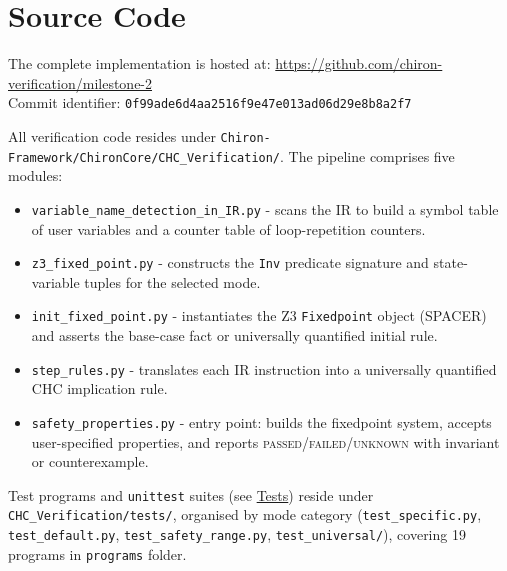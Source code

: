 \section*{Source Code}

The complete implementation is hosted at: \url{https://github.com/chiron-verification/milestone-2}
\\Commit identifier: \texttt{0f99ade6d4aa2516f9e47e013ad06d29e8b8a2f7}

\bigskip
\noindent
All verification code resides under \texttt{Chiron-Framework/ChironCore/CHC\_Verification/}.
The pipeline comprises five modules:

\begin{itemize}
  \item \texttt{variable\_name\_detection\_in\_IR.py} - scans the IR to build a symbol table of user variables and a counter table of loop-repetition counters.
  \item \texttt{z3\_fixed\_point.py} - constructs the \texttt{Inv} predicate signature and state-variable tuples for the selected mode.
  \item \texttt{init\_fixed\_point.py} - instantiates the Z3 \texttt{Fixedpoint} object (SPACER) and asserts the base-case fact or universally quantified initial rule.
  \item \texttt{step\_rules.py} - translates each IR instruction into a universally quantified CHC implication rule.
  \item \texttt{safety\_properties.py} - entry point: builds the fixedpoint system, accepts user-specified properties, and reports \textsc{passed}/\textsc{failed}/\textsc{unknown} with invariant or counterexample.
\end{itemize}

\noindent
Test programs and \texttt{unittest} suites (see \hyperref[sec:tests]{Tests}) reside under \texttt{CHC\_Verification/tests/}, organised by mode category (\texttt{test\_specific.py}, \texttt{test\_default.py}, \texttt{test\_safety\_range.py}, \texttt{test\_universal/}), covering 19 programs in \texttt{programs} folder.